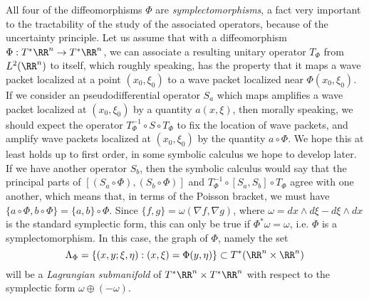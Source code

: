 All four of the diffeomorphisms $\Phi$ are \emph{symplectomorphisms}, a fact very important to the tractability of the study of the associated operators, because of the uncertainty principle. Let us assume that with a diffeomorphism $\Phi: T^* \RR^n \to T^* \RR^n$, we can associate a resulting unitary operator $T_\Phi$ from $L^2(\RR^n)$ to itself, which roughly speaking, has the property that it maps a wave packet localized at a point $(x_0,\xi_0)$ to a wave packet localized near $\Phi(x_0,\xi_0)$. If we consider an pseudodifferential operator $S_a$ which maps amplifies a wave packet localized at $(x_0,\xi_0)$ by a quantity $a(x,\xi)$, then morally speaking, we should expect the operator $T_\Phi^{-1} \circ S \circ T_\Phi$ to fix the location of wave packets, and amplify wave packets localized at $(x_0,\xi_0)$ by the quantity $a \circ \Phi$. We hope this at least holds up to first order, in some symbolic calculus we hope to develop later. If we have another operator $S_b$, then the symbolic calculus would say that the principal parts of  $[(S_a \circ \Phi), (S_b \circ \Phi)]$ and $T_\Phi^{-1} \circ [S_a, S_b] \circ T_\Phi$ agree with one another, which means that, in terms of the Poisson bracket, we must have $\{ a \circ \Phi, b \circ \Phi \} = \{ a, b \} \circ \Phi$. Since $\{ f,g \} = \omega( \nabla f, \nabla g )$, where $\omega = dx \wedge d\xi - d\xi \wedge dx$ is the standard symplectic form, this can only be true if $\Phi^* \omega = \omega$, i.e. $\Phi$ is a symplectomorphism. In this case, the graph of $\Phi$, namely the set
%
\[ \Lambda_\Phi = \{ (x,y;\xi,\eta) : (x,\xi) = \Phi(y,\eta) \} \subset T^*(\RR^n \times \RR^n) \]
%
will be a \emph{Lagrangian submanifold} of $T^* \RR^n \times T^* \RR^n$ with respect to the symplectic form $\omega \oplus (- \omega)$.
%

